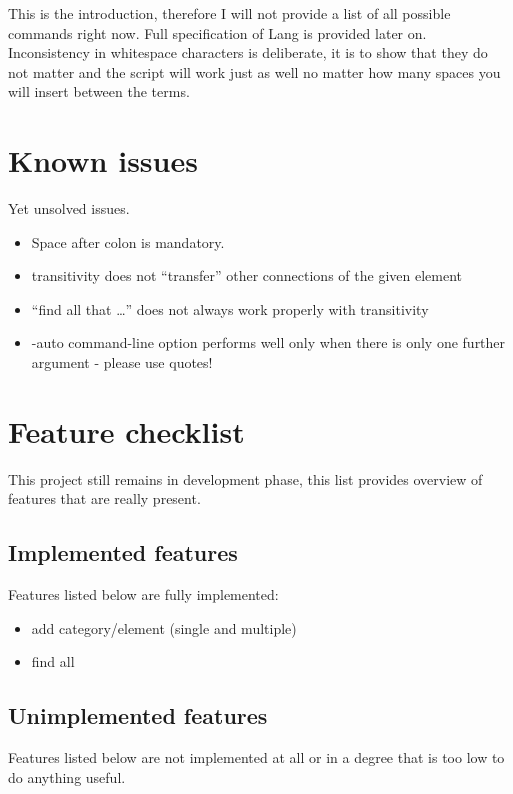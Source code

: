 \documentclass{article}
\begin{document}
This is the introduction, therefore I will not provide a list of all possible commands right now.
Full specification of Lang is provided later on. Inconsistency in whitespace characters is
deliberate, it is to show that they do not matter and the script will work just as well no matter
how many spaces you will insert between the terms.

\section{Known issues}
Yet unsolved issues.

\begin{itemize}

  \item Space after colon is mandatory.

  \item transitivity does not ``transfer'' other connections of the given element

  \item ``find all that \ldots'' does not always work properly with transitivity

  \item -auto command-line option performs well only when there is only one further argument -
  please use quotes!

\end{itemize}

\newpage

\section{Feature checklist}
This project still remains in development phase, this list provides overview of features that are
really present.

\subsection{Implemented features}
Features listed below are fully implemented:

\begin{itemize}

  \item add category/element (single and multiple)

  \item find all

\end{itemize}

\subsection{Unimplemented features}
Features listed below are not implemented at all or in a degree that is too low to do anything
useful.
\end{document}
